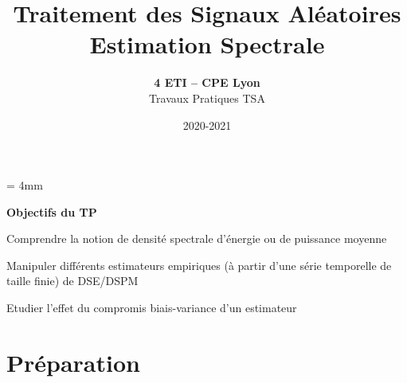 \documentclass{article}
\begin{document}
\baselineskip = 4mm
\title{Traitement des Signaux Aléatoires \\
Estimation Spectrale}
\author{\textbf{4 ETI -- CPE Lyon }\\[3mm]
{Travaux Pratiques TSA}}
\date{2020-2021}

\maketitle

\noindent{}
\vspace*{5mm}


\textbf{\Large Objectifs du TP}\\[4mm]

\begin{list}{-}{\setlength{\leftmargin}{3mm} \setlength{\labelwidth}{20mm} \setlength{\labelsep}{2mm} \setlength{\itemsep}{1mm} }
\item Comprendre la notion de densité spectrale d'énergie ou de puissance moyenne
\item Manipuler différents estimateurs empiriques (à partir d'une série temporelle de taille finie) de DSE/DSPM
\item Etudier l'effet du compromis biais-variance d'un estimateur
\end{list}


\vspace*{5mm}

\section{Préparation}
\end{document}
